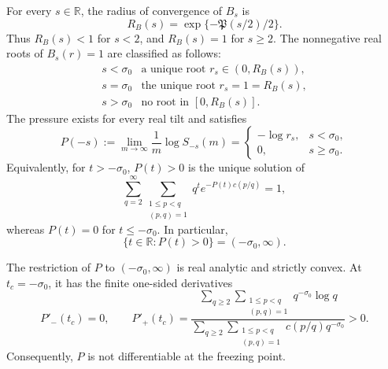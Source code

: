 \begin{theorem}
\label{thm:exact-negative-pressure}
\label{thm:all-real-pressure}
For every \(s\in\mathbb R\), the radius of convergence of \(B_s\) is
\begin{equation}
 R_B(s)=\exp\{-\mathfrak P(s/2)/2\}.
 \label{eq:Bs-radius}
\end{equation}
Thus \(R_B(s)<1\) for \(s<2\), and \(R_B(s)=1\) for \(s\ge2\).
The nonnegative real roots of \(B_s(r)=1\) are classified as follows:
\[
\begin{array}{c|c}
s<\sigma_0 & \text{a unique root }r_s\in(0,R_B(s)),\\
s=\sigma_0 & \text{the unique root }r_s=1=R_B(s),\\
s>\sigma_0 & \text{no root in }[0,R_B(s)].
\end{array}
\]
The pressure exists for every real tilt and satisfies
\begin{equation}
 P(-s):=\lim_{m\to\infty}\frac1m\log S_{-s}(m)
 =\begin{cases}
   -\log r_s,&s<\sigma_0,\\
   0,&s\ge\sigma_0.
  \end{cases}
 \label{eq:all-real-pressure}
\end{equation}
Equivalently, for \(t>-\sigma_0\), \(P(t)>0\) is the unique solution of
\begin{equation}
 \sum_{q=2}^{\infty}
 \sum_{\substack{1\le p<q\\(p,q)=1}}
 q^t e^{-P(t)c(p/q)}=1,
 \label{eq:exact-negative-pressure}
\end{equation}
whereas \(P(t)=0\) for \(t\le-\sigma_0\).  In particular,
\begin{equation}
 \{t\in\mathbb R:P(t)>0\}=(-\sigma_0,\infty).
 \label{eq:exact-zero-pressure-set}
\end{equation}

The restriction of \(P\) to \((-\sigma_0,\infty)\) is real analytic and
strictly convex.  At \(t_c=-\sigma_0\), it has the finite one-sided
derivatives
\begin{equation}
 P'_-(t_c)=0,
 \qquad
 P'_+(t_c)=
 \frac{\displaystyle
  \sum_{q\ge2}\sum_{\substack{1\le p<q\\(p,q)=1}}
       q^{-\sigma_0}\log q}
 {\displaystyle
  \sum_{q\ge2}\sum_{\substack{1\le p<q\\(p,q)=1}}
       c(p/q)q^{-\sigma_0}}>0.
 \label{eq:critical-pressure-slopes}
\end{equation}
Consequently, \(P\) is not differentiable at the freezing point.
\end{theorem}

